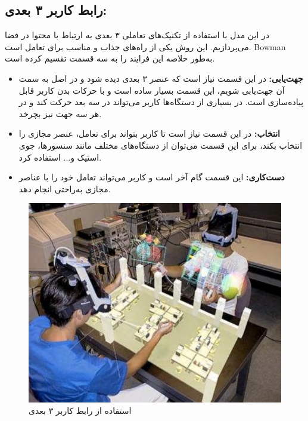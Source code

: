 \subsection{رابط کاربر ۳ بعدی\protect{}:}
در این مدل با استفاده از تکنیک‌های تعاملی ۳ بعدی به ارتباط با محتوا در فضا می‌پردازیم. این روش یکی از راه‌های جذاب و مناسب برای تعامل است. Bowman به‌طور خلاصه این فرایند را به سه قسمت تقسیم کرده است\cite{Bowman}.
\begin{itemize}
	\item 
	\textbf{
		جهت‌یابی\protect{}: }در این قسمت نیاز است که عنصر ۳ بعدی دیده شود و در اصل به سمت آن جهت‌یابی شویم، این قسمت بسیار ساده است و با حرکات بدن کاربر قابل پیاده‌سازی است. در بسیاری از دستگاه‌ها کاربر می‌تواند در سه بعد حرکت کند و در هر سه جهت نیز بچرخد.
	\item 
	\textbf{
		انتخاب:} در این قسمت نیاز است تا کاربر بتواند برای تعامل، عنصر مجازی را انتخاب بکند، برای این قسمت می‌توان از دستگاه‌های مختلف مانند سنسورها، جوی استیک و... استفاده کرد.
	\item 
	\textbf{
		دست‌کاری:} این قسمت گام آخر است و کاربر می‌تواند تعامل خود را با عناصر مجازی به‌راحتی انجام دهد.
\end{itemize}
\begin{figure}[tb]
	\centering
	\includegraphics[width=0.6\linewidth]{image/3d}
	\caption {استفاده از رابط کاربر ۳ بعدی \cite{Bowman}}
	\label{fig:Bowman}
\end{figure}
